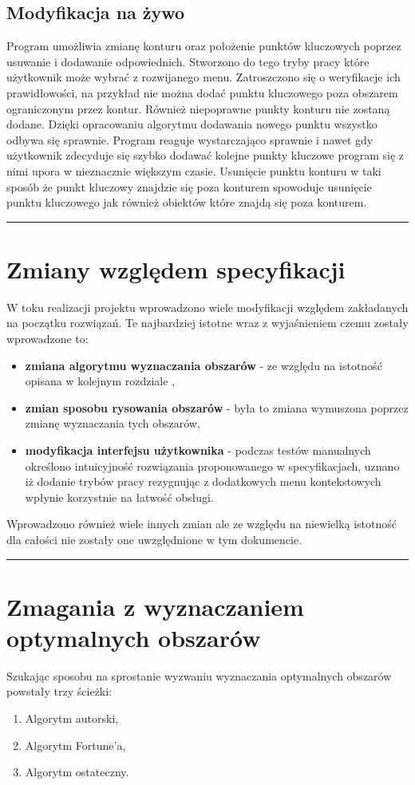\documentclass[a4paper,11pt]{article}
\newcommand{\linia}{\rule{\linewidth}{0.4mm}}
\begin{document}
\subsection{Modyfikacja na żywo}
Program umożliwia zmianę konturu oraz położenie punktów kluczowych poprzez usuwanie i dodawanie odpowiednich. Stworzono do tego tryby pracy które użytkownik może wybrać z rozwijanego menu. Zatroszczono się o weryfikacje ich prawidłowości, na przykład nie można dodać punktu kluczowego poza obszarem ograniczonym przez kontur. Również niepoprawne punkty konturu nie zostaną dodane. Dzięki opracowaniu algorytmu dodawania nowego punktu wszystko odbywa się sprawnie. Program reaguje wystarczająco sprawnie i nawet gdy użytkownik zdecyduje się szybko dodawać kolejne punkty kluczowe program się z nimi upora w nieznacznie większym czasie. Usunięcie punktu konturu w taki sposób że punkt kluczowy znajdzie się poza konturem spowoduje usunięcie punktu kluczowego jak również obiektów które znajdą się poza konturem.

\noindent\linia
\section{Zmiany względem specyfikacji}
W toku realizacji projektu wprowadzono wiele modyfikacji względem zakładanych na początku rozwiązań. Te najbardziej istotne wraz z wyjaśnieniem czemu zostały wprowadzone to:
\begin{itemize}
\item \textbf{zmiana algorytmu wyznaczania obszarów} - ze względu na istotność opisana w kolejnym rozdziale ,
\item \textbf{zmian sposobu rysowania obszarów} - była to zmiana wymuszona poprzez zmianę wyznaczania tych obszarów,
\item \textbf{modyfikacja interfejsu użytkownika} - podczas testów manualnych określono intuicyjność rozwiązania proponowanego w specyfikacjach, uznano iż dodanie trybów pracy rezygnując z dodatkowych menu kontekstowych wpłynie korzystnie na łatwość obsługi.
\end{itemize}
Wprowadzono również wiele innych zmian ale ze względu na niewielką istotność dla całości nie zostały one uwzględnione w tym dokumencie.

\noindent\linia
\section{Zmagania z wyznaczaniem optymalnych obszarów}
Szukając sposobu na sprostanie wyzwaniu wyznaczania optymalnych obszarów powstały trzy ścieżki:
\begin{enumerate}
\item Algorytm autorski,
\item Algorytm Fortune'a,
\item Algorytm ostateczny.
\end{enumerate}
\end{document}
